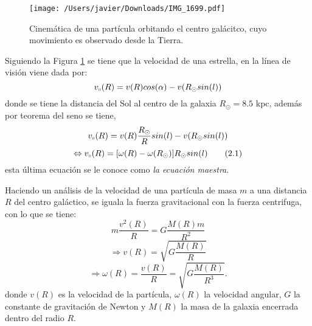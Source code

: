\documentclass[letterpaper,oneside]{article}
\begin{document}


\begin{figure}[H]
    \centering
    \texttt{[image: /Users/javier/Downloads/IMG\_1699.pdf]}
    \caption{Cinemática de una partícula orbitando el centro galácitco, cuyo movimiento es observado desde la Tierra.}
    \label{fig:mecanica}
\end{figure}

Siguiendo la Figura \ref{fig:mecanica} se tiene que la velocidad de una estrella, en la línea de visión viene dada por:
\begin{equation*}
v_{\shortparallel}(R)=v(R)cos(\alpha)-v(R_{\odot}sin(l))
\end{equation*}
donde se tiene la distancia del Sol al centro de la galaxia $R_{\odot}=8.5$ kpc, además por teorema del seno se tiene,
\begin{equation*}
v_{\shortparallel}(R)=v(R)\frac{R_{\odot}}{R}sin(l)-v(R_{\odot}sin(l))\\
\end{equation*}
\[
\Leftrightarrow v_{\shortparallel}(R)=[\omega(R)-\omega(R_{\odot})]R_{\odot}sin(l) \tag{2.1} \label{eq:ec-maestra}
\]
esta última ecuación se le conoce como \textit{la ecuación maestra}.

Haciendo un análisis de la velocidad de una partícula de masa $m$ a una distancia $R$ del centro galáctico, se iguala la fuerza gravitacional con la fuerza centrifuga, con lo que se tiene:
\[
m\frac{v^2(R)}{R}=G\frac{M(R)m}{R^2}
\]
\[
 \Rightarrow v(R)=\sqrt{G\frac{M(R)}{R}} \tag{2.2} \label{eq:velocidad}
\]
\[
 \Rightarrow \omega(R)=\frac{v(R)}{R}=\sqrt{G\frac{M(R)}{R^3}}.  \tag{2.3} \label{eq:omega}
\]
donde $v(R)$ es la velocidad de la partícula, $\omega(R)$ la velocidad angular, $G$ la constante de gravitación de Newton y $M(R)$ la masa de la galaxia encerrada dentro del radio $R$.
\end{document}
